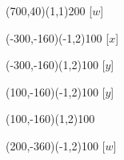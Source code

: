 \documentclass[12pt]{article}
\begin{document}
\begin{figure}[htb]
\begin{egame}
\putbranch(700,40)(1,1){200}
\ib{}{}[$w$]

\renewcommand{\egarrowstyle}{e}

\putbranch(-300,-160)(-1,2){100}
\ib{}{}[$x$]

\renewcommand{\egarrowstyle}{}

\putbranch(-300,-160)(1,2){100}
\ib{}{}[$y$]

\renewcommand{\egarrowstyle}{e}

\putbranch(100,-160)(-1,2){100}
\ib{}{}[$y$]

\renewcommand{\egarrowstyle}{}

\putbranch(100,-160)(1,2){100}
\ib{}{}

\renewcommand{\egarrowstyle}{}

\putbranch(200,-360)(-1,2){100}
\ib{}{}[$w$]

\renewcommand{\egarrowstyle}{e}


\end{egame}
\end{figure}
\end{document}
